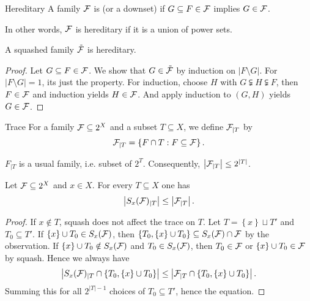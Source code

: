 \begin{definition}[def:]{Hereditary}
    A family $\mathcal{F}$ is  (or a downset) if $G\subseteq F\in \mathcal{F}$ implies $G\in \mathcal{F}$.

    In other words, $\mathcal{F}$ is hereditary if it is a union of power sets.
\end{definition}

\begin{proposition}{}
    A squashed family $\tilde{\mathcal{F}}$ is hereditary. 
\end{proposition}

\begin{proof}
    Let $G\subseteq F\in \mathcal{F}$. We show that $G\in \tilde{\mathcal{F}}$ by induction on $|F\setminus G|$. For $|F\setminus G|=1$, its just the property. For induction, choose $H$ with $G\subsetneqq H\subsetneqq F$, then $F\in \mathcal{F}$ and induction yields $H\in \mathcal{F}$. And apply induction to $(G,H)$ yields $G\in \mathcal{F}$.
\end{proof}

\begin{definition}[def:]{Trace}
    For a family $\mathcal{F}\subseteq 2^X$ and a subset $T\subseteq X$, we define  $\mathcal{F}_{|T}$ by
    \[\mathcal{F}_{|T}=\left\{F\cap T:F\subseteq \mathcal{F}\right\}.\]
\end{definition}

\begin{remark}
    $F_{|T}$ is a usual family, i.e. subset of $2^T$. Consequently, $\left|\mathcal{F}_{|T}\right|\leq 2^{|T|}$.
\end{remark}

\begin{proposition}{}
    Let $\mathcal{F}\subseteq 2^X$ and $x\in X$. For every $T\subseteq X$ one has
    \[\left|S_x(\mathcal{F})_{|T}\right|\leq \left|\mathcal{F}_{|T}\right|.\]
\end{proposition}

\begin{proof}
    If $x\notin T$, squash does not affect the trace on $T$. Let $T=\left\{x\right\}\sqcup T'$ and $T_0\subseteq T'$. If $\left\{x\right\}\cup T_0\in S_x(\mathcal{F})$, then $\left\{T_0,\left\{x\right\}\cup T_0\right\}\subseteq S_x(\mathcal{F})\cap \mathcal{F}$ by the observation. If $\left\{x\right\}\cup T_0\notin S_x(\mathcal{F})$ and $T_0\in S_x(\mathcal{F})$, then $T_0\in \mathcal{F}$ or $\left\{x\right\}\cup T_0\in \mathcal{F}$ by squash. Hence we always have
    \[\left|S_x(\mathcal{F})_{|T}\cap \left\{T_0,\left\{x\right\}\cup T_0\right\}\right|\leq \left|\mathcal{F}_{|T}\cap \left\{T_0,\left\{x\right\}\cup T_0\right\}\right|.\]
    Summing this for all $2^{|T|-1}$ choices of $T_0\subseteq T'$, hence the equation.
\end{proof}

